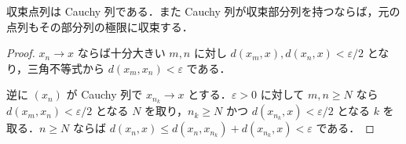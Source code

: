 \begin{prop}[収束列とCauchy列]
収束点列は Cauchy 列である．また Cauchy 列が収束部分列を持つならば，元の点列もその部分列の極限に収束する．
\end{prop}
\begin{proof}
$x_n\to x$ ならば十分大きい $m,n$ に対し $d(x_m,x),d(x_n,x)<\varepsilon/2$ となり，三角不等式から $d(x_m,x_n)<\varepsilon$ である．

逆に $(x_n)$ が Cauchy 列で $x_{n_k}\to x$ とする．$\varepsilon>0$ に対して $m,n\geq N$ なら $d(x_m,x_n)<\varepsilon/2$ となる $N$ を取り，$n_k\geq N$ かつ $d(x_{n_k},x)<\varepsilon/2$ となる $k$ を取る．$n\geq N$ ならば $d(x_n,x)\leq d(x_n,x_{n_k})+d(x_{n_k},x)<\varepsilon$ である．
\end{proof}

